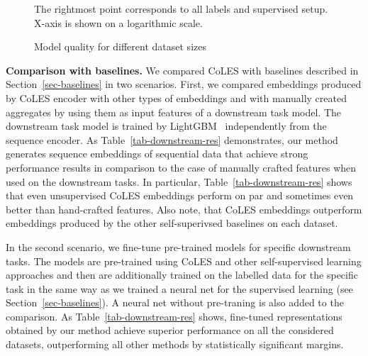 \documentclass{article}
\begin{document}
\begin{figure}
\begin{subfigure}[t]{0.49\linewidth}
    \label{fig-semi-assessment}
  \end{subfigure}%
  \caption{Model quality for different dataset sizes}
    \small{The rightmost point corresponds to all labels and supervised setup. X-axis is shown on a logarithmic scale.}
  \label{fig-semi-main}
\end{figure}

\textbf{Comparison with baselines.} We compared CoLES with baselines described in Section~\ref{sec-baselines} in two scenarios. First, we compared embeddings produced by CoLES encoder with other types of embeddings and with manually created aggregates by using them as input features of a downstream task model. The downstream task model is trained by LightGBM~\citep{Ke2017LightGBMAH}  independently from the sequence encoder. As Table~\ref{tab-downstream-res} demonstrates, our method generates sequence embeddings of sequential data that achieve strong performance results in comparison to the case of manually crafted features when used on the downstream tasks.
In particular, Table~\ref{tab-downstream-res} shows that even unsupervised CoLES embeddings perform on par and sometimes even better than hand-crafted features. Also note, that CoLES embeddings outperform embeddings produced by the other self-superivsed baselines on each dataset.

In the second scenario, we fine-tune pre-trained models for specific downstream tasks. The models are pre-trained using CoLES and other self-supervised learning approaches and then are additionally trained on the labelled data for the specific task in the same way as we trained a neural net for the supervised learning (see Section~\ref{sec-baselines}). A neural net without pre-traning is also added to the comparison. As Table~\ref{tab-downstream-res} shows, fine-tuned representations obtained by our method achieve superior performance on all the considered datasets, outperforming all other methods by statistically significant margins.
\end{document}
